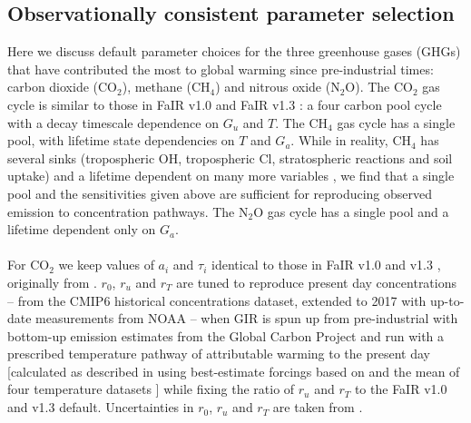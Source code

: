 \documentclass[gmd, manuscript]{copernicus}
\begin{document}
\subsection*{Observationally consistent parameter selection}
Here we discuss default parameter choices for the three greenhouse gases (GHGs) that have contributed the most to global warming since pre-industrial times: carbon dioxide (CO$_2$), methane (CH$_4$) and nitrous oxide (N$_2$O). The CO$_2$ gas cycle is similar to those in FaIR v1.0 \citep{Millar2016} and FaIR v1.3 \citep{Smith2017}: a four carbon pool cycle with a decay timescale dependence on $G_u$ and $T$. The CH$_4$ gas cycle has a single pool, with lifetime state dependencies on $T$ and $G_a$. While in reality, CH$_4$ has several sinks (tropospheric OH, tropospheric Cl, stratospheric reactions and soil uptake) and a lifetime dependent on many more variables \citep{Holmes2013}, we find that a single pool and the sensitivities given above are sufficient for reproducing observed emission to concentration pathways. The N$_2$O gas cycle has a single pool and a lifetime dependent only on $G_a$.\\\\
For CO$_2$ we keep values of $a_i$ and $\tau_i$ identical to those in FaIR v1.0 and v1.3 \citep{Millar2016,Smith2017}, originally from \cite{Myhre2013a}. $r_0$, $r_u$ and $r_T$ are tuned to reproduce present day concentrations -- from the CMIP6 historical concentrations dataset, extended to 2017 with up-to-date measurements from NOAA \citep{Meinshausen2017,Battle1996,Butler1999} -- when GIR is spun up from pre-industrial with bottom-up emission estimates from the Global Carbon Project \citep{Quere2018} and run with a prescribed temperature pathway of attributable warming to the present day [calculated as described in \cite{Haustein2017} using best-estimate forcings based on \cite{Forster2013} and the mean of four temperature datasets \citep{Vose2012,Cowtan2014,Lenssen2019,Morice2011}] while fixing the ratio of $r_u$ and $r_T$ to the FaIR v1.0 and v1.3 default. Uncertainties in $r_0$, $r_u$ and $r_T$ are taken from \cite{Millar2016}.\\\\
\end{document}
